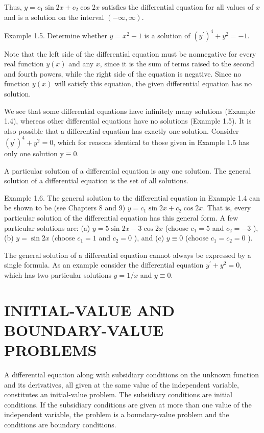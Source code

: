 \documentclass[10pt]{article}
\begin{document}
Thus, $y=c_{1} \sin 2 x+c_{2} \cos 2 x$ satisfies the differential equation for all values of $x$ and is a solution on the interval $(-\infty, \infty)$.

Example 1.5. Determine whether $y=x^{2}-1$ is a solution of $\left(y^{\prime}\right)^{4}+y^{2}=-1$.

Note that the left side of the differential equation must be nonnegative for every real function $y(x)$ and any $x$, since it is the sum of terms raised to the second and fourth powers, while the right side of the equation is negative. Since no function $y(x)$ will satisfy this equation, the given differential equation has no solution.

We see that some differential equations have infinitely many solutions (Example 1.4), whereas other differential equations have no solutions (Example 1.5). It is also possible that a differential equation has exactly one solution. Consider $\left(y^{\prime}\right)^{4}+y^{2}=0$, which for reasons identical to those given in Example 1.5 has only one solution $\mathrm{y} \equiv 0$.

A particular solution of a differential equation is any one solution. The general solution of a differential equation is the set of all solutions.

Example 1.6. The general solution to the differential equation in Example 1.4 can be shown to be (see Chapters 8 and 9) $y=c_{1} \sin 2 x+c_{2} \cos 2 x$. That is, every particular solution of the differential equation has this general form. A few particular solutions are: (a) $y=5 \sin 2 x-3 \cos 2 x$ (choose $c_{1}=5$ and $c_{2}=-3$ ), (b) $y=\sin 2 x$ (choose $c_{1}=1$ and $c_{2}=0$ ), and (c) $y \equiv 0$ (choose $c_{1}=c_{2}=0$ ).

The general solution of a differential equation cannot always be expressed by a single formula. As an example consider the differential equation $y^{\prime}+y^{2}=0$, which has two particular solutions $y=1 / x$ and $y \equiv 0$.

\section*{INITIAL-VALUE AND BOUNDARY-VALUE PROBLEMS}
A differential equation along with subsidiary conditions on the unknown function and its derivatives, all given at the same value of the independent variable, constitutes an initial-value problem. The subsidiary conditions are initial conditions. If the subsidiary conditions are given at more than one value of the independent variable, the problem is a boundary-value problem and the conditions are boundary conditions.
\end{document}
